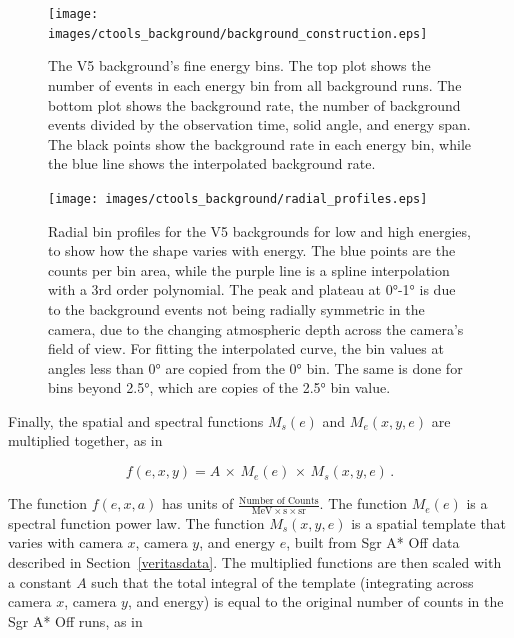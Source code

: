     \begin{figure}[p]
      \centering
      \texttt{[image: images/ctools\_background/background\_construction.eps]}
      \caption[CTOOLS Background Fine Energy Bins]{
        The V5 background's fine energy bins.
        The top plot shows the number of events in each energy bin from all background runs.
        The bottom plot shows the background rate, the number of background events divided by the observation time, solid angle, and energy span.
        The black points show the background rate in each energy bin, while the blue line shows the interpolated background rate.
      }
      \label{fig:background_profile}
    \end{figure}

    \begin{figure}[hb]
      \centering
      \texttt{[image: images/ctools\_background/radial\_profiles.eps]}
      \caption[CTOOLS Radial Background Profiles]{
        Radial bin profiles for the V5 backgrounds for low and high energies, to show how the shape varies with energy.
        The blue points are the counts per bin area, while the purple line is a spline interpolation with a 3rd order polynomial.
        The peak and plateau at \ang{0}-\ang{1} is due to the background events not being radially symmetric in the camera, due to the changing atmospheric depth across the camera's field of view.
        For fitting the interpolated curve, the bin values at angles less than \ang{0} are copied from the \ang{0} bin.
        The same is done for bins beyond \ang{2.5}, which are copies of the \ang{2.5} bin value.
        }
      \label{fig:background_radial}
    \end{figure}
    
    Finally, the spatial and spectral functions $M_{s} \left ( e \right )$ and $M_e \left(x,y,e \right )$ are multiplied together, as in
    
    \begin{equation}\label{eqn:bck_template}
      f(e,x,y) = A \, \times \, M_{e} \left ( e \right ) \, \times \, M_{s} \left ( x, y, e \right ) \,.
    \end{equation} 
    
    The function $f(e,x,a)$ has units of $\frac{\textrm{Number of Counts}}{ \textrm{MeV} \times \textrm{s} \times \textrm{sr} }$.
    The function $M_{e}(e)$ is a spectral function power law.
    The function $M_{s}(x,y,e)$ is a spatial template that varies with camera $x$, camera $y$, and energy $e$, built from Sgr A* Off data described in Section~\ref{veritasdata}.
    The multiplied functions are then scaled with a constant $A$ such that the total integral of the template (integrating across camera $x$, camera $y$, and energy) is equal to the original number of counts in the Sgr A* Off runs, as in
    
